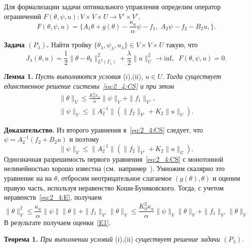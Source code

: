 Для формализации задачи оптимального управления определим оператор
ограничений $F(\theta, \psi, u) : V \times V \times U \rightarrow V' \times V'$,
\[
    F(\theta, \psi, u) = \{A_1\theta+g(\theta)-\frac{\kappa_a}{\alpha}\psi-f_1 ,\;
    A_2\psi-f_2-B_2u, \}.
\]


\textbf{Задача $(P_\lambda)$.} Найти тройку $\{\theta_\lambda, \psi_\lambda, u_\lambda \} \in V \times V \times U$
такую, что
\begin{equation}
    \label{eq:2_4:CP}
    J_\lambda(\theta, u) = \frac{1}{2}\|\theta -\theta_b\|^2_{L^2(\Gamma_1)}
    + \frac{\lambda}{2}\|u\|^2_U \rightarrow \text{inf},\;\; F(\theta, \psi, u)=0.
\end{equation}

\textbf{Лемма 1.}
\textit{
    Пусть выполняются условия} (i),(ii), $u\in U$. \textit{ Тогда
существует единственное решение системы~\eqref{eq:2_4:CS} и при этом}
\begin{equation}
    \label{eq:2_4:E1}
    \begin{aligned}
        \|\theta\|_V \leq
        \frac{K_0^2\kappa_a}{\alpha}\|\psi\|_V+\|f_1\|_{V'}, \\
        \|\psi\|_V\leq \|A_2^{-1}\|\left(\|f_2\|_{V'}+K_2\|u\|_U\right).
    \end{aligned}
\end{equation}

\textbf{Доказательство.}
Из второго уравнения в~\eqref{eq:2_4:CS} следует, что $\psi = A_2^{-1}(f_2+B_2 u)$  и поэтому
\[
    \|\psi\|_V\leq \|A_2^{-1}\|\left(\|f_2\|_{V'}+K_2\|u\|_U\right).
\]
Однозначная разрешимость первого уравнения~\eqref{eq:2_4:CS} с монотонной
нелинейностью хорошо известна (см.\ например~\cite{Kufner}).
Умножим скалярно это уравнение на на $\theta $,
отбросим неотрицательное слагаемое $(g(\theta),\theta)$ и оценим правую часть,
используя неравенство Коши-Буняковского.
Тогда, с учетом неравенств~\eqref{eq:2_4:E}, получаем
\[
    \|\theta\|^2_V \leq \frac{\kappa_a}{\alpha}\|\psi\|\|\theta\|+\|f_1\|_{V'}\|\theta\|_V\leq
    \frac{K_0^2\kappa_a}{\alpha}\|\psi\|_V\|\theta\|_V+\|f_1\|_{V'}\|\theta\|_V
\]
В результате получаем оценки~\eqref{E1}.

\textbf{Теорема 1.}
\textit{
    При выполнении условий} (i),(ii)
\textit{ существует решение задачи $(P_\lambda).$
}

